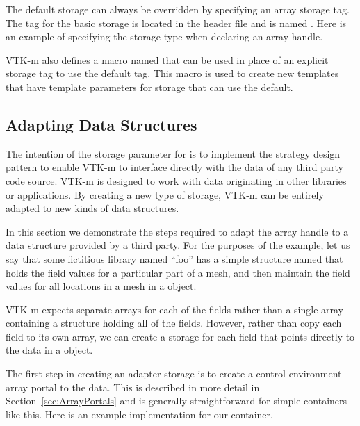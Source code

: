 The default storage can always be overridden by specifying an array
storage tag. The tag for the basic storage is located in the
 header file and is named
. Here is an example of specifying
the storage type when declaring an array handle.


VTK-m also defines a macro named 
that can be used in place of an explicit storage tag to use the
default tag. This macro is used to create new templates that have template
parameters for storage that can use the default.

\subsection{Adapting Data Structures}


The intention of the storage parameter for  is to
implement the strategy design pattern to enable VTK-m to interface directly
with the data of any third party code source. VTK-m is designed to work
with data originating in other libraries or applications. By creating a new
type of storage, VTK-m can be entirely adapted to new kinds of data
structures.

In this section we demonstrate the steps required to adapt the array handle
to a data structure provided by a third party. For the purposes of the
example, let us say that some fictitious library named ``foo'' has a simple
structure named  that holds the field values for a
particular part of a mesh, and then maintain the field values for all
locations in a mesh in a  object.


VTK-m expects separate arrays for each of the fields rather than a single
array containing a structure holding all of the fields. However, rather
than copy each field to its own array, we can create a storage for each
field that points directly to the data in a 
object.

The first step in creating an adapter storage is to create a control
environment array portal to the data. This is described in more detail in
Section~\ref{sec:ArrayPortals} and is generally straightforward for simple
containers like this. Here is an example implementation for our
 container.

